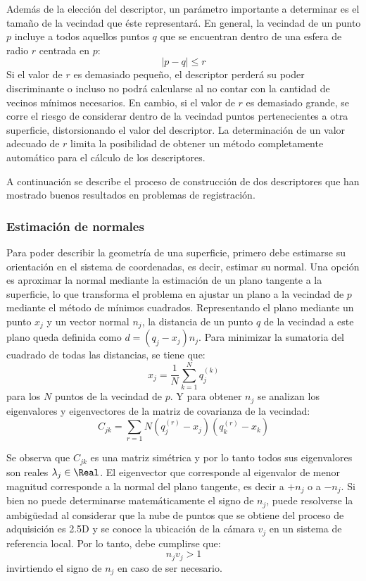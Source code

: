 Además de la elección del descriptor, un parámetro importante a determinar es
el tamaño de la vecindad que éste representará.
En general, la vecindad de un punto $p$ incluye a todos aquellos puntos $q$
que se encuentran dentro de una esfera de radio $r$ centrada en $p$:
\[ |p - q| \leq r \]
Si el valor de $r$ es demasiado pequeño, el descriptor perderá su poder discriminante
o incluso no podrá calcularse al no contar con la cantidad de vecinos mínimos necesarios.
En cambio, si el valor de $r$ es demasiado grande, se corre el riesgo de considerar
dentro de la vecindad puntos pertenecientes a otra superficie, distorsionando el valor del descriptor.
La determinación de un valor adecuado de $r$ limita la posibilidad de obtener un método completamente
automático para el cálculo de los descriptores\cite{RusuDoctoralDissertation}.


A continuación se describe el proceso de construcción de dos descriptores
que han mostrado buenos resultados en problemas de registración\cite{Rusu:2009:FPF:1703435.1703733}.

\subsubsection{Estimación de normales}
Para poder describir la geometría de una superficie,
primero debe estimarse su orientación en el sistema de coordenadas, es decir, estimar su normal.
Una opción es aproximar la normal mediante la estimación de un plano tangente a la superficie,
lo que transforma el problema en ajustar un plano a la vecindad de $p$
mediante el método de mínimos cuadrados.
Representando el plano mediante un punto $x_j$ y un vector normal $n_j$,
la distancia de un punto $q$ de la vecindad a este plano queda definida como
$d = (q_j - x_j) n_j$.
Para minimizar la sumatoria del cuadrado de todas las distancias, se tiene que:
\[x_j = \frac{1}{N} \sum_{k=1}^{N} q^{(k)}_j \]
para los $N$ puntos de la vecindad de $p$.
Y para obtener $n_j$ se analizan los eigenvalores y eigenvectores de la matriz de covarianza de la vecindad:
\[ C_{jk} = \sum_{r=1}{N} (q^{(r)}_j - x_j) (q^{(r)}_k - x_k) \]

Se observa que $C_{jk}$ es una matriz simétrica y por lo tanto todos sus eigenvalores son reales
$\lambda_j \in \Real$.
El eigenvector que corresponde al eigenvalor de menor magnitud corresponde a la normal del plano tangente,
es decir a $+n_j$ o a $-n_j$\cite{10.1109/34.334391}.
Si bien no puede determinarse matemáticamente el signo de $n_j$,
puede resolverse la ambigüedad al considerar que la nube de puntos que se obtiene del proceso de adquisición
es 2.5D y se conoce la ubicación de la cámara $v_j$ en un sistema de referencia local.
Por lo tanto, debe cumplirse que:
\[n_j v_j > 1\]
invirtiendo el signo de $n_j$ en caso de ser necesario.


